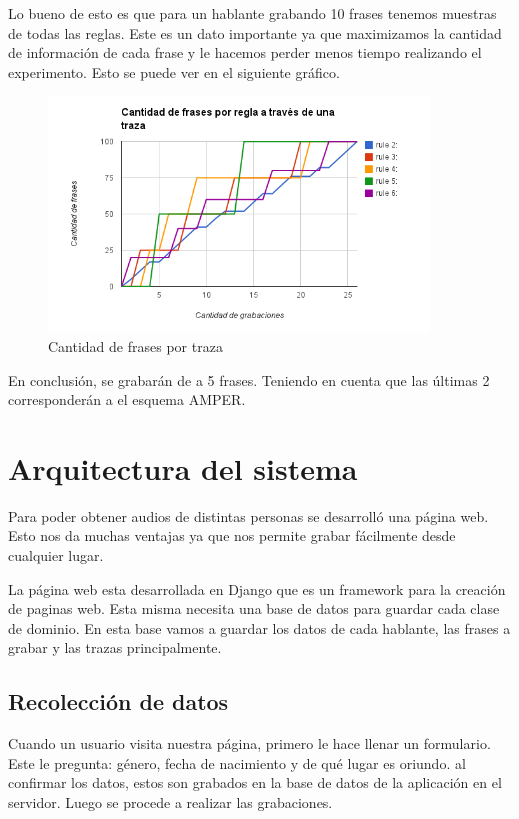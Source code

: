 \documentclass[11pt,a4paper,twoside]{tesis}
\begin{document}
Lo bueno de esto es que para un hablante grabando 10 frases tenemos muestras de todas las reglas. Este es un dato importante ya que maximizamos la cantidad de información de cada frase y le hacemos perder menos tiempo realizando el experimento. Esto se puede ver en el siguiente gráfico.


\begin{figure}[h!]
    \centerline{\includegraphics[width=0.9\textwidth]{cant_frases_traza_inf} }
    \caption{Cantidad de frases por traza}
\end{figure}

En conclusión, se grabarán de a 5 frases. Teniendo en cuenta que las últimas 2 corresponderán a el esquema AMPER. 

\chapter{Arquitectura del sistema}

Para poder obtener audios de distintas personas se desarrolló una página web. Esto nos da muchas ventajas ya que nos permite grabar fácilmente desde cualquier lugar.  

La página web esta desarrollada en Django que es un framework para la creación de paginas web. Esta misma necesita una base de datos para guardar cada clase de dominio. En esta base vamos a guardar los datos de cada hablante, las frases a grabar y las trazas principalmente.

\section{Recolección de datos}

Cuando un usuario visita nuestra página, primero le hace llenar un formulario. Este le pregunta: género, fecha de nacimiento y de qué lugar es oriundo. al confirmar los datos, estos son grabados en la base de datos de la aplicación en el servidor. Luego se procede a realizar las grabaciones. 
\end{document}
